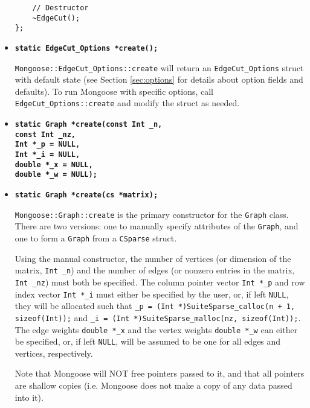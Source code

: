 \documentclass[letter]{article}
\begin{document}
\begin{itemize}
\begin{lstlisting}
    // Destructor
    ~EdgeCut();
};
\end{lstlisting}

\vspace{6pt}
\item \textbf{\texttt{static EdgeCut\_Options *create();}}

\texttt{Mongoose::EdgeCut\_Options::create} will return an \texttt{EdgeCut\_Options} struct with default state (see Section \ref{sec:options} for details about option fields and defaults). To run Mongoose with specific options, call \texttt{EdgeCut\_Options::create} and modify the struct as needed.
\vspace{6pt}
\item \textbf{\texttt{static Graph *create(const Int \_n, \\
\hspace*{4.2cm} const Int \_nz, \\
\hspace*{4.2cm} Int *\_p = NULL, \\
\hspace*{4.2cm} Int *\_i = NULL, \\
\hspace*{4.2cm} double *\_x = NULL, \\
\hspace*{4.2cm} double *\_w = NULL);}}
\item \textbf{\texttt{static Graph *create(cs *matrix);}}

\texttt{Mongoose::Graph::create} is the primary constructor for the \texttt{Graph} class. There are two versions: one to manually specify attributes of the \texttt{Graph}, and one to form a \texttt{Graph} from a \texttt{CSparse} struct.

Using the manual constructor, the number of vertices (or dimension of the matrix, \texttt{Int \_n}) and the number of edges (or nonzero entries in the matrix, \texttt{Int \_nz}) must both be specified. The column pointer vector \texttt{Int *\_p} and row index vector \texttt{Int *\_i} must either be specified by the user, or, if left \texttt{NULL}, they will be allocated such that \texttt{\_p = (Int *)SuiteSparse\_calloc(n + 1, sizeof(Int));} and \texttt{\_i = (Int *)SuiteSparse\_malloc(nz, sizeof(Int));}. The edge weights \texttt{double *\_x} and the vertex weights \texttt{double *\_w} can either be specified, or, if left \texttt{NULL}, will be assumed to be one for all edges and vertices, respectively.

Note that Mongoose will NOT free pointers passed to it, and that all pointers are shallow copies (i.e. Mongoose does not make a copy of any data passed into it).


\end{itemize}
\end{document}

